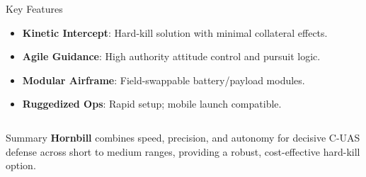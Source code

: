 \documentclass[english,final,hyperref={pdfpagelabels=false}]{beamer}
\begin{document}
\begin{frame}{ }
\begin{columns}[t]
\begin{block}{\Large Key Features}
\begin{itemize}
    \item \textbf{Kinetic Intercept}: Hard-kill solution with minimal collateral effects.
    \item \textbf{Agile Guidance}: High authority attitude control and pursuit logic.
    \item \textbf{Modular Airframe}: Field-swappable battery/payload modules.
    \item \textbf{Ruggedized Ops}: Rapid setup; mobile launch compatible.
\end{itemize}
\end{block}

\end{columns}

\vfill

\begin{block}{\Large Summary}
\large \textbf{Hornbill} combines speed, precision, and autonomy for decisive C-UAS defense across short to medium ranges, providing a robust, cost-effective hard-kill option.
\end{block}


\end{frame}
\end{document}
